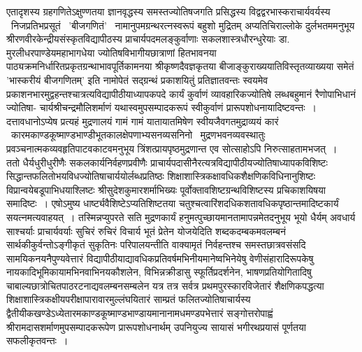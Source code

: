 \documentclass[11pt, openany]{book}
\begin{document}
\vspace{-4mm}
एतादृशस्य \;ग्रहगणितेऽक्षुण्णतया \;ज्ञानवृद्धस्य \;समस्तज्योतिषजगति \;प्रसिद्धस्य
विद्वद्वरभास्कराचार्यवर्यस्य ~निजप्रतिभप्रसूतं ~{\qt 'बीजगणितं'} ~नामानुपमग्रन्थरत्नस्वरूपं बहुशो मुद्रितम् अप्यतिचिराल्लोके दुर्लभतममनुभूय
श्रीरणवीरकेन्द्रीयसंस्कृतविद्यापीठस्य प्राचार्यपदमलङ्कुर्वाणाः सकलशास्त्रधौरन्धुरेयाः
डा.
मुरलीधरपाण्डेयमहाभागधेया ज्योतिषविभागीयछात्राणां हितभावनया
पाठ्यक्रमनिर्धारितप्रकृतग्रन्थाभावपूर्तिकामनया श्रीकृष्णदैवज्ञकृतया
बीजाङ्कुराख्ययातिविस्तृतव्याख्यया समेतं {\qt 'भास्करीयं बीजगणितम्'} इति नामोपेतं
सद्ग्रन्थं प्रकाशयितुं प्रतिज्ञातवन्तः स्वयमेव
प्रकाशनभारमुद्वहन्तश्चात्रत्यविद्यापीठीयाध्यापकपदे कार्यं कुर्वाणं व्यावहारिकज्योतिषे लब्धबहुमानं रैणोपाभिधानं
ज्योतिषा-	चार्यश्रीचन्द्रमौलिशर्माणं यथास्वमुपसम्पादकरूपं स्वीकुर्वाणं
प्रारूपशोधनायादिष्टवन्तः~।\\

\vspace{-4mm}
दत्तावधानोऽप्येष प्रत्यहं मुद्रणालयं गामं गामं यातायातमिषेण स्वीयजैवगतमुद्राव्ययं कारं ~कारमकाण्डकूष्माण्डभाण्डीभूतकालक्षेपणाभ्यसनव्यसनिनो ~मुद्रणभवनव्यवस्थातुः प्रवञ्चनात्मकव्यवहृतिपाटवकाटवमनुभूय
त्रिंशत्प्रायपृष्ठमुद्रणान्त एव सोत्साहोऽपि निरुत्साहतामभजत्~।\\

\vspace{-4mm}
ततो धैर्यधुरीधुरीणैः सकलकार्यनिर्वहणप्रवीणैः
प्राचार्यपदासीनैरत्यत्रविद्यापीठीयज्योतिषाध्यापकविशिष्टः
सिद्धान्तफलितोभयविधज्योतिषाचार्ययोर्लब्धप्रतिष्ठः
शिक्षाशास्त्रिकक्षावधिकशैक्षणिकविधिनानुशिष्टः
विप्रान्वयेबडूपाभिधयाश्लिष्टः श्रीसुदेशकुमारशर्माभिख्यः पूर्वोक्तावशिष्टग्रन्थविशिष्टस्य प्रचिकाशयिषया समादिष्टः~।
एषोऽमुष्य धार्ष्ट्यवैशिष्टेऽप्यतिशिष्टतया
चतुश्चत्वारिंशदधिकशतावधिकपृष्ठान्तमादिष्टकार्यं
\thispagestyle{empty}
\newpage
\noindent सयत्नमत्यवाहयत्~। तस्मिन्नप्युपरते सति मुद्रणकार्यं
हनुमत्पुच्छायमानतामापन्नमेतदनुभूय भूयो धैर्यम् अवधार्य साश्चर्याः प्राचार्यवर्याः सुचिरं रुचिरं
विचार्य भूतं प्रेतेन
योजयेदिति शब्दकदम्बकमवलम्बनं सार्थकीकुर्वन्तोऽङ्गीकृतं सुकृतिनः
परिपालयन्तीति
वाक्यामृतं निर्वहन्तश्च समस्तछात्रवसंसदि सामयिकनयनैपुण्यवेत्तारं
विद्यापीठीयाद्यावधिकप्रतिवर्षमभिनीयमानेष्वभिनेयेषु वेणीसंहारादिरूपकेषु
नायकादिभूमिकायामभिनवाभिनयकौशलेन, विभिन्नक्रीडासु स्फूर्तिप्रदर्शनेन, भाषणप्रतियोगितादिषु
चाबाल्यछात्रोचितपाठरटनाद्यवलम्बनसम्बलेन यत्र तत्र सर्वत्र
प्रथमपुरस्कारविजेतारं
शैक्षणिकपद्धत्या शिक्षाशास्त्रिकक्षीयपरीक्षापारावारमुल्लंघयितारं
साम्प्रतं फलितज्योतिषाचार्यस्य
द्वैतीयीकखण्डेऽध्येतारमकाण्डकूष्माण्डभाण्डायमानानामधमण्डपभेत्तारं
सङ्गोत्तरोपाह्वं श्रीरामदासशर्माणमुपसम्पादकरूपेण
प्रारूपशोधनार्थम् उपनियुज्य सायासं
भगीरथप्रयासं पूर्णतया सफलीकृतवन्तः~।\\
\end{document}
